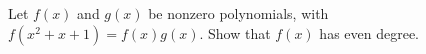 Let $f(x)$ and $g(x)$ be nonzero polynomials, with $f(x^2 + x + 1) = f(x)g(x)$. Show that $f(x)$ has even degree.
